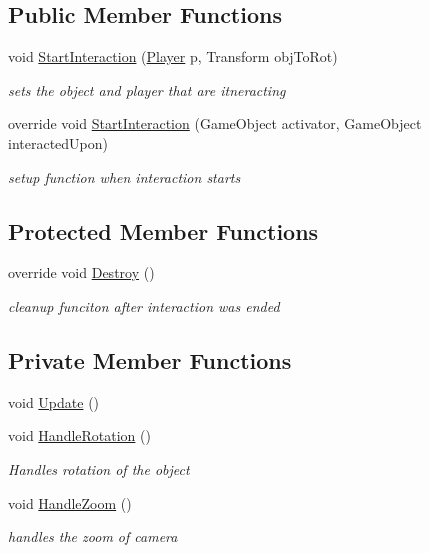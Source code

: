 \subsection*{Public Member Functions}
\begin{DoxyCompactItemize}
\item 
void \mbox{\hyperlink{class_object_in_hand_component_a3399bcee7bffea9b599f1dd8d6e2a93c}{Start\+Interaction}} (\mbox{\hyperlink{class_player}{Player}} p, Transform obj\+To\+Rot)
\begin{DoxyCompactList}\small\item\em sets the object and player that are itneracting \end{DoxyCompactList}\item 
override void \mbox{\hyperlink{class_object_in_hand_component_aed115a3a0f70c23370cab4428454025c}{Start\+Interaction}} (Game\+Object activator, Game\+Object interacted\+Upon)
\begin{DoxyCompactList}\small\item\em setup function when interaction starts \end{DoxyCompactList}\end{DoxyCompactItemize}
\subsection*{Protected Member Functions}
\begin{DoxyCompactItemize}
\item 
override void \mbox{\hyperlink{class_object_in_hand_component_a932b69c4977ec0836389b71a6aa1366c}{Destroy}} ()
\begin{DoxyCompactList}\small\item\em cleanup funciton after interaction was ended \end{DoxyCompactList}\end{DoxyCompactItemize}
\subsection*{Private Member Functions}
\begin{DoxyCompactItemize}
\item 
void \mbox{\hyperlink{class_object_in_hand_component_aa3e0ef83a3a10b498b95eb07a405b0e9}{Update}} ()
\item 
void \mbox{\hyperlink{class_object_in_hand_component_aa00e6e5af513b7c24e36e7e74b1f7ae4}{Handle\+Rotation}} ()
\begin{DoxyCompactList}\small\item\em Handles rotation of the object \end{DoxyCompactList}\item 
void \mbox{\hyperlink{class_object_in_hand_component_a01fb8169d53ed7176d1aae0729f7caa1}{Handle\+Zoom}} ()
\begin{DoxyCompactList}\small\item\em handles the zoom of camera \end{DoxyCompactList}\end{DoxyCompactItemize}
